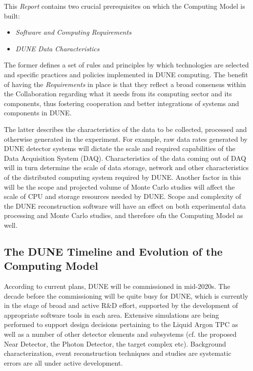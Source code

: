 This \textit{Report} contains two crucial prerequisites on which the Computing Model is built:
\begin{itemize}
\item \textit{Software and Computing Requirements}
\item \textit{DUNE Data Characteristics}
\end{itemize}

The former defines a set of rules and principles by which technologies are selected and specific practices and policies implemented in DUNE computing.
The benefit of having the \textit{Requirements} in place is that they reflect a broad consensus within the Collaboration regarding what it needs from
its computing sector and its components, thus fostering cooperation and better integrations of systems and components in DUNE.

The latter describes the characteristics of the data to be collected, processed and otherwise generated in the experiment.
For example, raw data rates generated by DUNE detector systems will dictate the scale and required capabilities of the Data
Acquisition System (DAQ).  Characteristics of the data coming out of DAQ will in turn determine the scale of data storage, network
and other characteristics of the distributed computing system required by DUNE. Another factor in this will be the scope and projected
volume of Monte Carlo studies  will affect the scale of CPU and storage resources needed by DUNE.  Scope and complexity of the DUNE
reconstruction software will have an effect on both experimental data processing and Monte Carlo studies, and therefore ofn the
Computing Model as well.



\subsection{The DUNE Timeline and Evolution of the Computing Model}
According to current plans, DUNE will be commissioned in mid-2020s. The decade before the commissioning will be quite busy
for DUNE, which is currently in the stage of broad and active R\&D effort, supported by the development of appropriate 
software tools in each area. Extensive simulations are being performed to support design decisions pertaining to the Liquid 
Argon TPC as well as a number of other detector elements and subsystems (cf. the proposed Near Detector, the Photon Detector, 
the target complex etc). Background characterization, event reconstruction techniques and studies are systematic errors are all under active development.

